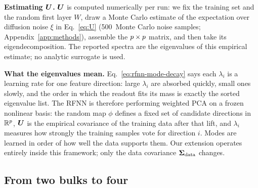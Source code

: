 \textbf{Estimating $\bm{U}$.}
$\bm{U}$ is computed numerically per run: we fix the training set
and the random first layer $W$, draw a Monte Carlo estimate of the
expectation over diffusion noise $\xi$ in Eq.~\eqref{eq:U}
(500~Monte Carlo noise samples;
Appendix~\ref{app:methods}), assemble the
$p \times p$ matrix, and then take its eigendecomposition.
The reported spectra are the eigenvalues of this empirical estimate;
no analytic surrogate is used.

\textbf{What the eigenvalues mean.}
Eq.~\eqref{eq:rfnn-mode-decay} says each $\lambda_i$ is a learning
rate for one feature direction: large $\lambda_i$ are absorbed
quickly, small ones slowly, and the order in which the readout
fits its mass is exactly the sorted eigenvalue list. The RFNN is
therefore performing weighted PCA on a frozen nonlinear basis: the
random map $\phi$ defines a fixed set of candidate directions in
$\mathbb{R}^{p}$, $\bm{U}$ is the empirical covariance of the training
data after that lift, and $\lambda_i$ measures how strongly the
training samples vote for direction $i$. Modes are learned in order
of how well the data supports them. Our extension operates entirely
inside this framework; only the data covariance $\bm{\Sigma}_{\mathrm{data}}$
changes.

\subsection{From two bulks to four}
\label{sec:rfnn-fourbulks}

